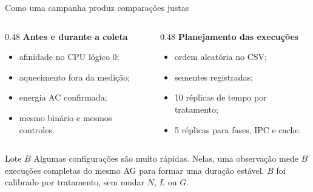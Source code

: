 \documentclass[aspectratio=169,11pt]{beamer}
\begin{document}
\begin{frame}{Como uma campanha produz comparações justas}
    \begin{columns}[T,onlytextwidth]
        \begin{column}{0.48\textwidth}
            \textbf{Antes e durante a coleta}
            \begin{itemize}
                \item afinidade no CPU lógico 0;
                \item aquecimento fora da medição;
                \item energia AC confirmada;
                \item mesmo binário e mesmos controles.
            \end{itemize}
        \end{column}
        \begin{column}{0.48\textwidth}
            \textbf{Planejamento das execuções}
            \begin{itemize}
                \item ordem aleatória no CSV;
                \item sementes registradas;
                \item 10 réplicas de tempo por tratamento;
                \item 5 réplicas para fases, IPC e cache.
            \end{itemize}
        \end{column}
    \end{columns}
    \vspace{0.25cm}
    \begin{questionbox}{Lote $B$}
        Algumas configurações são muito rápidas. Nelas, uma observação mede $B$ execuções
        completas do mesmo AG para formar uma duração estável. $B$ foi calibrado por tratamento,
        sem mudar $N$, $L$ ou $G$.
    \end{questionbox}
\end{frame}
\end{document}
